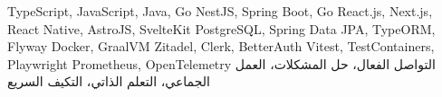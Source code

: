 \begin{cvskills}

   {\textenglish{TypeScript, JavaScript, Java, Go}}
   {\textenglish{NestJS, Spring Boot, Go}}
   {\textenglish{React.js, Next.js, React Native, AstroJS, SvelteKit}}
   {\textenglish{PostgreSQL, Spring Data JPA, TypeORM, Flyway}}
   {\textenglish{Docker, GraalVM}}
   {\textenglish{Zitadel, Clerk, BetterAuth}}
   {\textenglish{Vitest, TestContainers, Playwright}}
   {\textenglish{Prometheus, OpenTelemetry}}
   {\textarabic{التواصل الفعال، حل المشكلات، العمل الجماعي، التعلم الذاتي، التكيف السريع}}

\end{cvskills}
